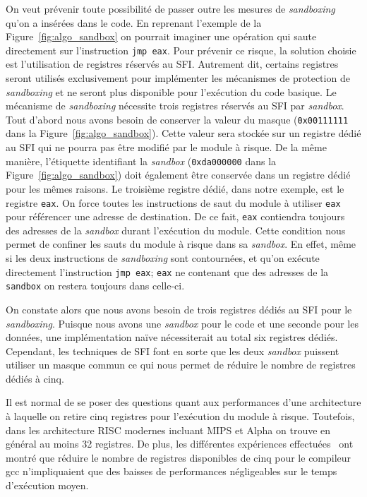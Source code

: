 \documentclass[11pt]{sdm}
\begin{document}
On veut prévenir toute possibilité de passer outre les mesures de \textit{sandboxing} qu'on a insérées dans le code. En reprenant l'exemple de la Figure~\ref{fig:algo_sandbox} on pourrait imaginer une opération qui saute directement sur l'instruction \texttt{jmp eax}. Pour prévenir ce risque, la solution choisie est l'utilisation de registres réservés au SFI. Autrement dit, certains registres seront utilisés exclusivement pour implémenter les mécanismes de protection de \textit{sandboxing} et ne seront plus disponible pour l'exécution du code basique.
Le mécanisme de \textit{sandboxing} nécessite trois registres réservés au SFI par \textit{sandbox}. Tout d'abord nous avons besoin de conserver la valeur du masque (\texttt{0x00111111} dans la Figure~\ref{fig:algo_sandbox}). Cette valeur sera stockée sur un registre dédié au SFI qui ne pourra pas être modifié par le module à risque. De la même manière, l'étiquette identifiant la \textit{sandbox} (\texttt{0xda000000} dans la Figure~\ref{fig:algo_sandbox}) doit également être conservée dans un registre dédié pour les mêmes raisons. Le troisième registre dédié, dans notre exemple, est le registre \texttt{eax}. On force toutes les instructions de saut du module à utiliser \texttt{eax} pour référencer une adresse de destination. De ce fait, \texttt{eax} contiendra toujours des adresses de la \textit{sandbox} durant l'exécution du module.
Cette condition nous permet de confiner les sauts du module à risque dans sa \textit{sandbox}. En effet, même si les deux instructions de \textit{sandboxing} sont contournées, et qu'on exécute directement l'instruction \texttt{jmp eax}; \texttt{eax} ne contenant que des adresses de la \texttt{sandbox} on restera toujours dans celle-ci. 

On constate alors que nous avons besoin de trois registres dédiés au SFI pour le \textit{sandboxing}. Puisque nous avons une \textit{sandbox} pour le code et une seconde pour les données, une implémentation naïve nécessiterait au total six registres dédiés. Cependant, les techniques de SFI font en sorte que les deux \textit{sandbox} puissent utiliser un masque commun ce qui nous permet de réduire le nombre de registres dédiés à cinq.

Il est normal de se poser des questions quant aux performances d'une architecture à laquelle on retire cinq registres pour l'exécution du module à risque. Toutefois, dans les architecture RISC modernes incluant MIPS et Alpha on trouve en général au moins 32 registres. De plus, les différentes expériences effectuées~\cite{Wahbe:1993:ESF:173668.168635} ont montré que réduire le nombre de registres disponibles de cinq pour le compileur gcc n'impliquaient que des baisses de performances négligeables sur le temps d'exécution moyen.
\end{document}
